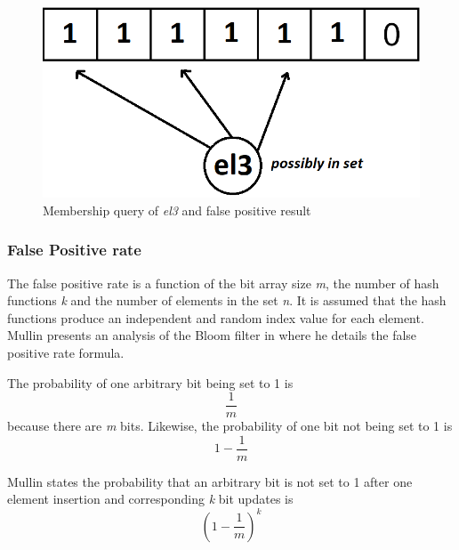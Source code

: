 \begin{figure}[!htb]
    \begin{center}
      \includegraphics[scale=0.4]{figures/fp-bloom-3.png}
      \caption[Bloom filter false positive]{Membership query of \textit{el3} and false positive result}
      \label{fig:bloom-filter-fp3}
    \end{center}
\end{figure}



\subsubsection*{False Positive rate}
The false positive rate is a function of the bit array size \textit{m}, the number of hash functions \textit{k} and the number of elements in the set \textit{n}. It is assumed that the hash functions produce an independent and random index value for each element. Mullin presents an analysis of the Bloom filter in \cite{Mullin-Bloom-Analysis} where he details the false positive rate formula. 

The probability of one arbitrary bit being set to 1 is
\begin{equation}
    \frac{1}{m}
\end{equation}
because there are \textit{m} bits. Likewise, the probability of one bit not being set to 1 is
\begin{equation}
    1-\frac{1}{m}
\end{equation}

Mullin states the probability that an arbitrary bit is not set to 1 after one element insertion and corresponding \textit{k} bit updates is
\begin{equation}
    (1-\frac{1}{m})^\textit{k}
\end{equation}

